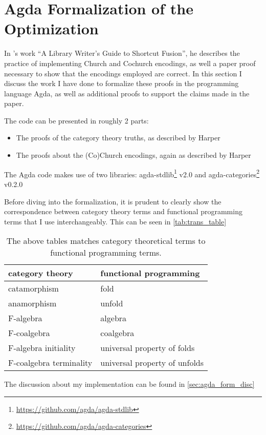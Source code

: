 \section{Agda Formalization of the Optimization}\label{sec:formalization}
In \cite{Harper2011}'s work ``A Library Writer's Guide to Shortcut Fusion'', he describes the practice of implementing Church and Cochurch encodings, as well a paper proof necessary to show that the encodings employed are correct.
In this section I discuss the work I have done to formalize these proofs in the programming language Agda, as well as additional proofs to support the claims made in the paper.

The code can be presented in roughly 2 parts:
\begin{itemize}[noitemsep]
  \item The proofs of the category theory truths, as described by Harper
  \item The proofs about the (Co)Church encodings, again as described by Harper
\end{itemize}

The Agda code makes use of two libraries: agda-stdlib\footnote{\url{https://github.com/agda/agda-stdlib}} v2.0 and agda-categories\footnote{\url{https://github.com/agda/agda-categories}} v0.2.0

Before diving into the formalization, it is prudent to clearly show the correspondence between category theory terms and functional programming terms that I use interchangeably.
This can be seen in \autoref{tab:trans_table}
\begin{table}[h]
  \centering
  \begin{tabular}{|l|l|}\hline
    \textbf{category theory} & \textbf{functional programming} \\\hline
    catamorphism             & fold                            \\
    anamorphism              & unfold                          \\
    F-algebra                & algebra                         \\
    F-coalgebra              & coalgebra                       \\
    F-algebra initiality     & universal property of folds     \\
    F-coalgebra terminality  & universal property of unfolds   \\\hline
  \end{tabular}
  \caption{The above tables matches category theoretical terms to functional programming terms.}
  \label{tab:trans_table}
\end{table}
The discussion about my implementation can be found in \autoref{sec:agda_form_disc}




